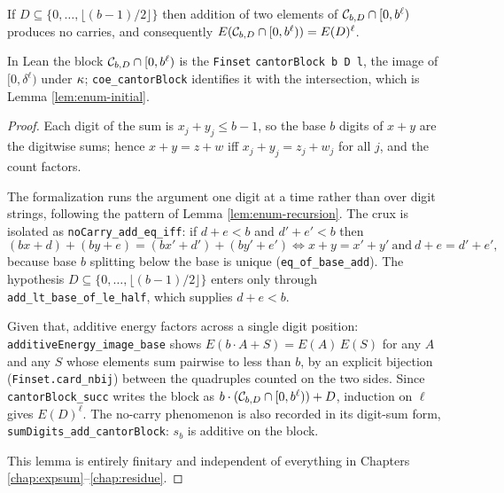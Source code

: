\begin{lemma}[No carries]
  \label{lem:noCarry}
  \leanok
  If $D \subseteq \{0, \ldots, \lfloor (b-1)/2 \rfloor\}$ then addition of two
  elements of $\mathcal{C}_{b,D} \cap [0,b^\ell)$ produces no carries, and consequently
  $E(\mathcal{C}_{b,D} \cap [0,b^\ell)) = E(D)^\ell$.

  In Lean the block $\mathcal{C}_{b,D} \cap [0,b^\ell)$ is the \texttt{Finset}
  \texttt{cantorBlock b D l}, the image of $[0,\delta^\ell)$ under $\kappa$;
  \texttt{coe\_cantorBlock} identifies it with the intersection, which is
  Lemma \ref{lem:enum-initial}.
\end{lemma}
\begin{proof}
  \leanok
  Each digit of the sum is $x_j + y_j \leq b-1$, so the base $b$ digits of
  $x+y$ are the digitwise sums; hence $x + y = z + w$ iff
  $x_j + y_j = z_j + w_j$ for all $j$, and the count factors.

  The formalization runs the argument one digit at a time rather than over
  digit strings, following the pattern of Lemma \ref{lem:enum-recursion}.  The
  crux is isolated as \texttt{noCarry\_add\_eq\_iff}: if $d + e < b$ and
  $d' + e' < b$ then
  \[
    (bx + d) + (by + e) = (bx' + d') + (by' + e')
    \iff x + y = x' + y' \ \text{and} \ d + e = d' + e',
  \]
  because base $b$ splitting below the base is unique
  (\texttt{eq\_of\_base\_add}).  The hypothesis
  $D \subseteq \{0,\ldots,\lfloor (b-1)/2\rfloor\}$ enters only through
  \texttt{add\_lt\_base\_of\_le\_half}, which supplies $d + e < b$.

  Given that, additive energy factors across a single digit position:
  \texttt{additiveEnergy\_image\_base} shows
  $E(b \cdot A + S) = E(A)\,E(S)$ for any $A$ and any $S$ whose elements sum
  pairwise to less than $b$, by an explicit bijection
  (\texttt{Finset.card\_nbij}) between the quadruples counted on the two
  sides.  Since \texttt{cantorBlock\_succ} writes the block as
  $b \cdot (\mathcal{C}_{b,D} \cap [0,b^\ell)) + D$, induction on $\ell$ gives
  $E(D)^\ell$.  The no-carry phenomenon is also recorded in its digit-sum
  form, \texttt{sumDigits\_add\_cantorBlock}: $s_b$ is additive on the block.

  This lemma is entirely finitary and independent of everything in Chapters
  \ref{chap:expsum}--\ref{chap:residue}.
\end{proof}

